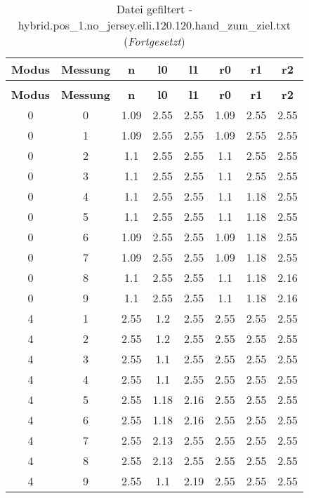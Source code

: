 \begin{longtable}{|c|c||c||c|c||c|c|c|}
	\caption{Datei gefiltert - hybrid.pos\_1.no\_jersey.elli.120.120.hand\_zum\_ziel.txt} \label{tab:hybrid.pos-1.no-jersey.elli.120.120.hand-zum-ziel.txt} \\ \hline
	\textbf{Modus} & \textbf{Messung} & \textbf{n} & \textbf{l0} & \textbf{l1} & \textbf{r0} & \textbf{r1} & \textbf{r2}\\ \hline
	\endfirsthead
	\caption[]{Datei gefiltert - hybrid.pos\_1.no\_jersey.elli.120.120.hand\_zum\_ziel.txt (\emph{Fortgesetzt})} \\ \hline
	\textbf{Modus} & \textbf{Messung} & \textbf{n} & \textbf{l0} & \textbf{l1} & \textbf{r0} & \textbf{r1} & \textbf{r2}\\ \hline
	\endhead
	0 & 0 & 1.09 & 2.55 & 2.55 & 1.09 & 2.55 & 2.55 \\ \hline
	0 & 1 & 1.09 & 2.55 & 2.55 & 1.09 & 2.55 & 2.55 \\ \hline
	0 & 2 & 1.1 & 2.55 & 2.55 & 1.1 & 2.55 & 2.55 \\ \hline
	0 & 3 & 1.1 & 2.55 & 2.55 & 1.1 & 2.55 & 2.55 \\ \hline
	0 & 4 & 1.1 & 2.55 & 2.55 & 1.1 & 1.18 & 2.55 \\ \hline
	0 & 5 & 1.1 & 2.55 & 2.55 & 1.1 & 1.18 & 2.55 \\ \hline
	0 & 6 & 1.09 & 2.55 & 2.55 & 1.09 & 1.18 & 2.55 \\ \hline
	0 & 7 & 1.09 & 2.55 & 2.55 & 1.09 & 1.18 & 2.55 \\ \hline
	0 & 8 & 1.1 & 2.55 & 2.55 & 1.1 & 1.18 & 2.16 \\ \hline
	0 & 9 & 1.1 & 2.55 & 2.55 & 1.1 & 1.18 & 2.16 \\ \hline
	4 & 1 & 2.55 & 1.2 & 2.55 & 2.55 & 2.55 & 2.55 \\ \hline
	4 & 2 & 2.55 & 1.2 & 2.55 & 2.55 & 2.55 & 2.55 \\ \hline
	4 & 3 & 2.55 & 1.1 & 2.55 & 2.55 & 2.55 & 2.55 \\ \hline
	4 & 4 & 2.55 & 1.1 & 2.55 & 2.55 & 2.55 & 2.55 \\ \hline
	4 & 5 & 2.55 & 1.18 & 2.16 & 2.55 & 2.55 & 2.55 \\ \hline
	4 & 6 & 2.55 & 1.18 & 2.16 & 2.55 & 2.55 & 2.55 \\ \hline
	4 & 7 & 2.55 & 2.13 & 2.55 & 2.55 & 2.55 & 2.55 \\ \hline
	4 & 8 & 2.55 & 2.13 & 2.55 & 2.55 & 2.55 & 2.55 \\ \hline
	4 & 9 & 2.55 & 1.1 & 2.19 & 2.55 & 2.55 & 2.55 \\ \hline

\end{longtable}
